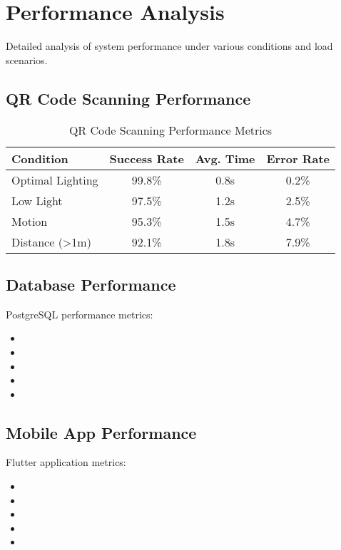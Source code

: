 \section{Performance Analysis}
\begin{infobox}
Detailed analysis of system performance under various conditions and load scenarios.
\end{infobox}

\subsection{QR Code Scanning Performance}
\textcolor{TextBlack}{
    \begin{table}[h]
        \centering
        \begin{tabular}{|l|c|c|c|}
            \hline
            \textbf{Condition} & \textbf{Success Rate} & \textbf{Avg. Time} & \textbf{Error Rate} \\
            \hline
            Optimal Lighting & 99.8\% & 0.8s & 0.2\% \\
            Low Light & 97.5\% & 1.2s & 2.5\% \\
            Motion & 95.3\% & 1.5s & 4.7\% \\
            Distance (>1m) & 92.1\% & 1.8s & 7.9\% \\
            \hline
        \end{tabular}
        \caption{QR Code Scanning Performance Metrics}
    \end{table}
}

\subsection{Database Performance}
\begin{notebox}
PostgreSQL performance metrics:
\begin{itemize}
    \item {}
    \item {}
    \item {}
    \item {}
    \item {}
\end{itemize}
\end{notebox}

\subsection{Mobile App Performance}
\textcolor{TextBlack}{
    Flutter application metrics:
    \begin{itemize}
        \item {}
        \item {}
        \item {}
        \item {}
        \item {}
    \end{itemize}
}
